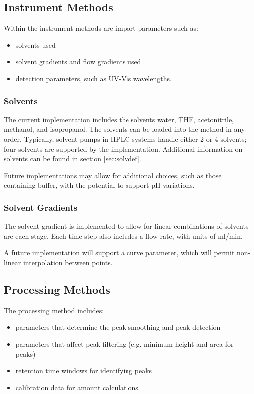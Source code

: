 \documentclass{article}
\begin{document}
\subsection{Instrument Methods}
Within the instrument methods are import parameters such as:
\begin{itemize}
\item solvents used
\item solvent gradients and flow gradients used
\item detection parameters, such as UV-Vis wavelengths.
\end{itemize}

\subsubsection{Solvents}
The current implementation includes the solvents water, THF, acetonitrile, methanol, and isopropanol. The solvents can be loaded into the method in any order. Typically, solvent pumps in HPLC systems handle either 2 or 4 solvents; four solvents are supported by the implementation. Additional information on solvents can be found in section \ref{sec:solvdef}.

Future implementations may allow for additional choices, such as those containing buffer, with the potential to support pH variations.

\subsubsection{Solvent Gradients}
The solvent gradient is implemented to allow for linear combinations of solvents are each stage. Each time step also includes a flow rate, with units of ml/min. 

A future implementation will support a curve parameter, which will permit non-linear interpolation between points. 

\subsection{Processing Methods}\label{sec:procmeth}

The processing method includes:
\begin{itemize}
\item parameters that determine the peak smoothing and peak detection
\item parameters that affect peak filtering (e.g. minimum height and area for peaks)
\item retention time windows for identifying peaks
\item calibration data for amount calculations
\end{itemize}
\end{document}
